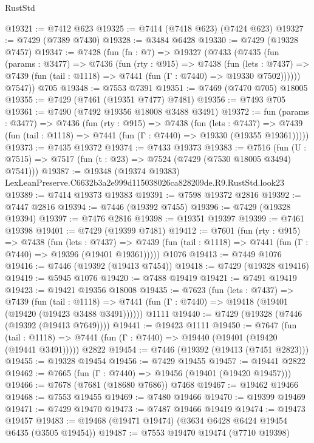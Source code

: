 \begin{lexlean}{RustStd}
\begin{coremodule}
@19321 := @7412 @623
@19325 := @7414 (@7418 @623) (@7424 @623)
@19327 := @7429 (@7389 @7430)
@19328 := @3484 @6428
@19330 := @7429 (@19328 @7457)
@19347 := @7428
    (fun (fn : @7) =>
    @19327
      (@7433
        (@7435
          (fun (params : @3477) =>
          @7436
            (fun (rty : @915) =>
            @7438
              (fun (lets : @7437) =>
              @7439 (fun (tail : @1118) => @7441 (fun (Γ : @7440) => @19330 @7502))))))
        @7547))
    @705
@19348 := @7553 @7391
@19351 := @7469 (@7470 @705) @18005
@19355 := @7429 (@7461 (@19351 @7477) @7481)
@19356 := @7493 @705
@19361 := @7490 (@7492 @19356 @18008 @3488 @3491)
@19372 := fun (params : @3477) =>
  @7436
    (fun (rty : @915) =>
    @7438
      (fun (lets : @7437) =>
      @7439 (fun (tail : @1118) => @7441 (fun (Γ : @7440) => @19330 (@19355 @19361)))))
@19373 := @7435 @19372
@19374 := @7433 @19373
@19383 := @7516
    (fun (U : @7515) => @7517 (fun (t : @23) => @7524 (@7429 (@7530 @18005 @3494) @7541)))
@19387 := @19348 (@19374 @19383) LexLeanPreserve.C6632b3a2e999d115038026ca828209de.R9.RustStd.look23
@19389 := @7414 @19373 @19383
@19391 := @7598 @19372 @2816
@19392 := @7447 @2816
@19394 := @7446 (@19392 @7455)
@19396 := @7429 (@19328 @19394)
@19397 := @7476 @2816
@19398 := @19351 @19397
@19399 := @7461 @19398
@19401 := @7429 (@19399 @7481)
@19412 := @7601
    (fun (rty : @915) =>
    @7438
      (fun (lets : @7437) =>
      @7439 (fun (tail : @1118) => @7441 (fun (Γ : @7440) => @19396 (@19401 @19361)))))
    @1076
@19413 := @7449 @1076
@19416 := @7446 (@19392 (@19413 @7454))
@19418 := @7429 (@19328 @19416)
@19419 := @5945 @1076
@19420 := @7488 @19419
@19421 := @7491 @19419
@19423 := @19421 @19356 @18008
@19435 := @7623
    (fun (lets : @7437) =>
    @7439
      (fun (tail : @1118) =>
      @7441 (fun (Γ : @7440) => @19418 (@19401 (@19420 (@19423 @3488 @3491))))))
    @1111
@19440 := @7429 (@19328 (@7446 (@19392 (@19413 @7649))))
@19441 := @19423 @1111
@19450 := @7647
    (fun (tail : @1118) => @7441 (fun (Γ : @7440) => @19440 (@19401 (@19420 (@19441 @3491)))))
    @2822
@19454 := @7446 (@19392 (@19413 (@7451 @2823)))
@19455 := @19328 @19454
@19456 := @7429 @19455
@19457 := @19441 @2822
@19462 := @7665 (fun (Γ : @7440) => @19456 (@19401 (@19420 @19457)))
@19466 := @7678 (@7681 (@18680 @7686)) @7468
@19467 := @19462 @19466
@19468 := @7553 @19455
@19469 := @7480 @19466
@19470 := @19399 @19469
@19471 := @7429 @19470
@19473 := @7487 @19466 @19419
@19474 := @19473 @19457
@19483 := @19468 (@19471 @19474) (@3634 @6428 @6424 @19454 @6435 (@3505 @19454))
@19487 := @7553 @19470 @19474 (@7710 @19398)

\end{coremodule}
\end{lexlean}
